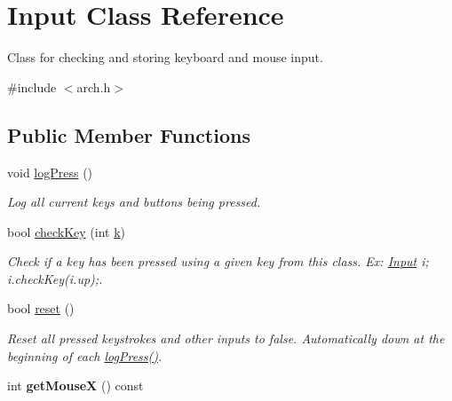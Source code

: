 \hypertarget{classInput}{}\section{Input Class Reference}
\label{classInput}


Class for checking and storing keyboard and mouse input.  




{\ttfamily \#include $<$arch.\+h$>$}

\subsection*{Public Member Functions}
\begin{DoxyCompactItemize}
\item 
void \hyperlink{classInput_a7664a52377e4bda7524d288df481954b}{log\+Press} ()\hypertarget{classInput_a7664a52377e4bda7524d288df481954b}{}\label{classInput_a7664a52377e4bda7524d288df481954b}

\begin{DoxyCompactList}\small\item\em Log all current keys and buttons being pressed. \end{DoxyCompactList}\item 
bool \hyperlink{classInput_a2f5d21366e04e3ce200fe73c6c748dd8}{check\+Key} (int \hyperlink{classInput_aa069678fdc7c45c405c044ed8e45a379}{k})\hypertarget{classInput_a2f5d21366e04e3ce200fe73c6c748dd8}{}\label{classInput_a2f5d21366e04e3ce200fe73c6c748dd8}

\begin{DoxyCompactList}\small\item\em Check if a key has been pressed using a given key from this class. Ex\+: \hyperlink{classInput}{Input} i; i.\+check\+Key(i.\+up);. \end{DoxyCompactList}\item 
bool \hyperlink{classInput_ac4fc1b961553d6ca8a603ee0a53f311c}{reset} ()\hypertarget{classInput_ac4fc1b961553d6ca8a603ee0a53f311c}{}\label{classInput_ac4fc1b961553d6ca8a603ee0a53f311c}

\begin{DoxyCompactList}\small\item\em Reset all pressed keystrokes and other inputs to false. Automatically down at the beginning of each \hyperlink{classInput_a7664a52377e4bda7524d288df481954b}{log\+Press()}. \end{DoxyCompactList}\item 
int {\bfseries get\+MouseX} () const \hypertarget{classInput_a08e8c4c83414948fa86aadda2c206569}{}\label{classInput_a08e8c4c83414948fa86aadda2c206569}


\end{DoxyCompactItemize}
